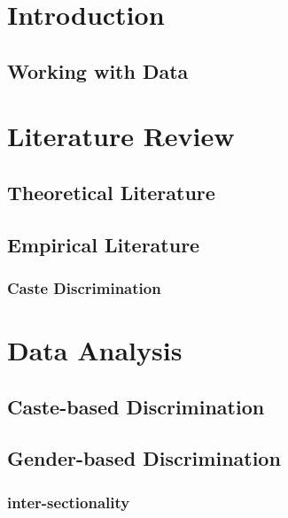 \documentclass[12pt]{article}
\begin{document}
\vspace{1cm}
\begin{flushleft}

\section{Introduction}
	\subsection{Working with Data}
\section{Literature Review}
	\subsection{Theoretical Literature}
	\subsection{Empirical Literature}
		\subsubsection{Caste Discrimination}
\section{Data Analysis}
	\subsection{Caste-based Discrimination}
	\subsection{Gender-based Discrimination}
		\subsubsection{inter-sectionality}

\end{flushleft}
\end{document}
